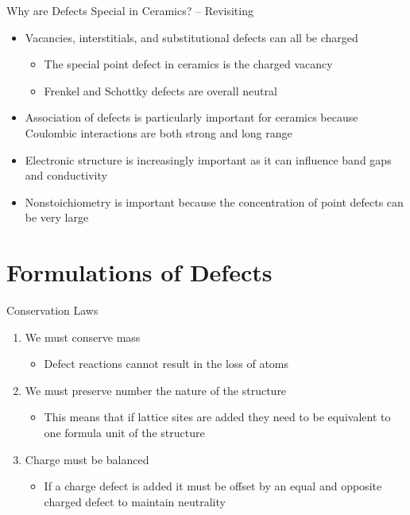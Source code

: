 \documentclass{libs/XJTLU_format}
\begin{document}
\begin{frame}{Why are Defects Special in Ceramics? -- Revisiting}
\begin{itemize}
    \item Vacancies, interstitials, and substitutional defects can all be charged \pause
    \begin{itemize}
        \item The special point defect in ceramics is the charged vacancy
        \item Frenkel and Schottky defects are overall neutral \pause
    \end{itemize}
    \item Association of defects is particularly important for ceramics because Coulombic interactions are both strong and long range \pause
    \item Electronic structure is increasingly important as it can influence band gaps and conductivity \pause
    \item Nonstoichiometry is important because the concentration of point defects can be very large
\end{itemize}
    
\end{frame}

\section{Formulations of Defects}
\begin{frame}{Conservation Laws}
\begin{enumerate}
    \item We must conserve mass
    \begin{itemize}
        \item Defect reactions cannot result in the loss of atoms \pause
    \end{itemize}
    \item We must preserve number the nature of the structure
    \begin{itemize}
        \item This means that if lattice sites are added they need to be equivalent to one formula unit of the structure \pause
    \end{itemize}
    \item Charge must be balanced
    \begin{itemize}
        \item If a charge defect is added it must be offset by an equal and opposite charged defect to maintain neutrality
    \end{itemize}
\end{enumerate}
    
\end{frame}
\end{document}
